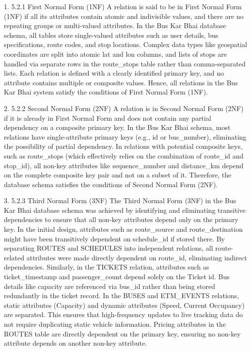 1.	5.2.1 First Normal Form (1NF)
A relation is said to be in First Normal Form (1NF) if all its attributes contain atomic and indivisible values, and there are no repeating groups or multi-valued attributes. In the Bus Kar Bhai database schema, all tables store single-valued attributes such as user details, bus specifications, route codes, and stop locations. Complex data types like geospatial coordinates are split into atomic lat and lon columns, and lists of stops are handled via separate rows in the route_stops table rather than comma-separated lists. Each relation is defined with a clearly identified primary key, and no attribute contains multiple or composite values. Hence, all relations in the Bus Kar Bhai system satisfy the conditions of First Normal Form (1NF).

2.	5.2.2 Second Normal Form (2NF)
A relation is in Second Normal Form (2NF) if it is already in First Normal Form and does not contain any partial dependency on a composite primary key. In the Bus Kar Bhai schema, most relations have single-attribute primary keys (e.g., id or bus_number), eliminating the possibility of partial dependency. In relations with potential composite keys, such as route_stops (which effectively relies on the combination of route_id and stop_id), all non-key attributes like sequence_number and distance_km depend on the complete composite key pair and not on a subset of it. Therefore, the database schema satisfies the conditions of Second Normal Form (2NF).

3.	5.2.3 Third Normal Form (3NF)
The Third Normal Form (3NF) in the Bus Kar Bhai database schema was achieved by identifying and eliminating transitive dependencies to ensure that all non-key attributes depend only on the primary key. In the initial design, attributes such as route_source and route_destination might have been transitively dependent on schedule_id if stored there. By separating ROUTES and SCHEDULES into independent relations, all route-related attributes were made directly dependent on route_id, eliminating indirect dependencies.
Similarly, in the TICKETS relation, attributes such as ticket_timestamp and passenger_count depend solely on the Ticket id. Bus details like capacity are referenced via bus_id rather than being stored redundantly in the ticket record. In the BUSES and ETM_EVENTS relations, static attributes (Capacity) and dynamic attributes (Speed, Current Occupancy) are separated. This ensures that high-frequency updates to live tracking data do not require duplicating static vehicle information. Pricing attributes in the ROUTES table are directly dependent on the primary key, ensuring no non-key attribute depends on another non-key attribute.

